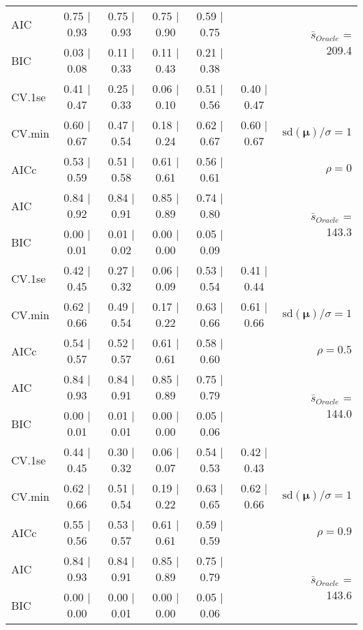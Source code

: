 \begin{table}
\begin{center}
\begin{tabular}{l*{5}{c}|r}
AIC & 0.75 $\mid$ 0.93 & 0.75 $\mid$ 0.93 & 0.75 $\mid$ 0.90 & 0.59 $\mid$ 0.75 & &  \multirow{2}{*}{$\bar{s}_{Oracle}$ = 209.4} \\
BIC & 0.03 $\mid$ 0.08 & 0.11 $\mid$ 0.33 & 0.11 $\mid$ 0.43 & 0.21 $\mid$ 0.38 & &  \\
 \hline 
CV.1se & 0.41 $\mid$ 0.47 & 0.25 $\mid$ 0.33 & 0.06 $\mid$ 0.10 & 0.51 $\mid$ 0.56 & 0.40 $\mid$ 0.47 & \\
CV.min & 0.60 $\mid$ 0.67 & 0.47 $\mid$ 0.54 & 0.18 $\mid$ 0.24 & 0.62 $\mid$ 0.67 & 0.60 $\mid$ 0.67 &  $\mathrm{sd}(\mathbf{\mu})/\sigma=1$ \\
AICc & 0.53 $\mid$ 0.59 & 0.51 $\mid$ 0.58 & 0.61 $\mid$ 0.61 & 0.56 $\mid$ 0.61 & & $\rho=0$ \\
AIC & 0.84 $\mid$ 0.92 & 0.84 $\mid$ 0.91 & 0.85 $\mid$ 0.89 & 0.74 $\mid$ 0.80 & &  \multirow{2}{*}{$\bar{s}_{Oracle}$ = 143.3} \\
BIC & 0.00 $\mid$ 0.01 & 0.01 $\mid$ 0.02 & 0.00 $\mid$ 0.00 & 0.05 $\mid$ 0.09 & &  \\
 \hline 
CV.1se & 0.42 $\mid$ 0.45 & 0.27 $\mid$ 0.32 & 0.06 $\mid$ 0.09 & 0.53 $\mid$ 0.54 & 0.41 $\mid$ 0.44 & \\
CV.min & 0.62 $\mid$ 0.66 & 0.49 $\mid$ 0.54 & 0.17 $\mid$ 0.22 & 0.63 $\mid$ 0.66 & 0.61 $\mid$ 0.66 &  $\mathrm{sd}(\mathbf{\mu})/\sigma=1$ \\
AICc & 0.54 $\mid$ 0.57 & 0.52 $\mid$ 0.57 & 0.61 $\mid$ 0.61 & 0.58 $\mid$ 0.60 & & $\rho=0.5$ \\
AIC & 0.84 $\mid$ 0.93 & 0.84 $\mid$ 0.91 & 0.85 $\mid$ 0.89 & 0.75 $\mid$ 0.79 & &  \multirow{2}{*}{$\bar{s}_{Oracle}$ = 144.0} \\
BIC & 0.00 $\mid$ 0.01 & 0.01 $\mid$ 0.01 & 0.00 $\mid$ 0.00 & 0.05 $\mid$ 0.06 & &  \\
 \hline 
CV.1se & 0.44 $\mid$ 0.45 & 0.30 $\mid$ 0.32 & 0.06 $\mid$ 0.07 & 0.54 $\mid$ 0.53 & 0.42 $\mid$ 0.43 & \\
CV.min & 0.62 $\mid$ 0.66 & 0.51 $\mid$ 0.54 & 0.19 $\mid$ 0.22 & 0.63 $\mid$ 0.65 & 0.62 $\mid$ 0.66 &  $\mathrm{sd}(\mathbf{\mu})/\sigma=1$ \\
AICc & 0.55 $\mid$ 0.56 & 0.53 $\mid$ 0.57 & 0.61 $\mid$ 0.61 & 0.59 $\mid$ 0.59 & & $\rho=0.9$ \\
AIC & 0.84 $\mid$ 0.93 & 0.84 $\mid$ 0.91 & 0.85 $\mid$ 0.89 & 0.75 $\mid$ 0.79 & &  \multirow{2}{*}{$\bar{s}_{Oracle}$ = 143.6} \\
BIC & 0.00 $\mid$ 0.00 & 0.00 $\mid$ 0.01 & 0.00 $\mid$ 0.00 & 0.05 $\mid$ 0.06 & &  \\

\end{tabular}
\end{center}
\end{table}
